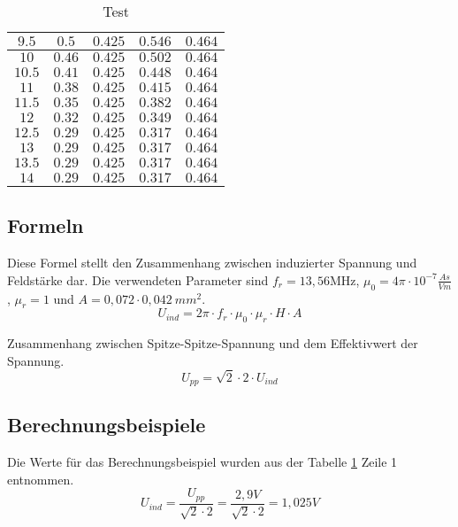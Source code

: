 \documentclass[12pt,a4paper,ngerman]{article}
\begin{document}
\begin{table}[H]
\begin{center}
\begin{tabular}{ |c|c|c|c|c| }
  $9.5$ & $0.5$ & $0.425$ & $0.546$ & $0.464$ \\
      \hline
  $10$ & $0.46$ & $0.425$ & $0.502$ & $0.464$ \\
      \hline
  $10.5$ & $0.41$ & $0.425$ & $0.448$ & $0.464$ \\
      \hline
  $11$ & $0.38$ & $0.425$ & $0.415$ & $0.464$ \\
      \hline
  $11.5$ & $0.35$ & $0.425$ & $0.382$ & $0.464$ \\
      \hline
  $12$ & $0.32$ & $0.425$ & $0.349$ & $0.464$ \\
      \hline
  $12.5$ & $0.29$ & $0.425$ & $0.317$ & $0.464$ \\
      \hline
  $13$ & $0.29$ & $0.425$ & $0.317$ & $0.464$ \\
      \hline
  $13.5$ & $0.29$ & $0.425$ & $0.317$ & $0.464$ \\
        \hline
  $14$ & $0.29$ & $0.425$ & $0.317$ & $0.464$ \\  \hline
\end{tabular}
\caption{Test}
\end{center}
\label{tab:1}
\end{table}
\pagebreak
\subsection{Formeln}
Diese Formel stellt den Zusammenhang zwischen induzierter Spannung und Feldstärke dar. Die verwendeten Parameter sind $f_r = 13,56$MHz, $\mu_0 = 4\pi \cdot 10^{-7}\frac{As}{Vm}$, $\mu_r = 1$ und $A = 0,072 \cdot 0,042\ mm^2$.
\begin{equation}
U_{ind} = 2\pi \cdot f_r \cdot \mu_0 \cdot \mu_r \cdot H \cdot A
\end{equation}

Zusammenhang zwischen Spitze-Spitze-Spannung und dem Effektivwert der Spannung.
\begin{equation}
U_{pp} = \sqrt{2}  \cdot 2 \cdot U_{ind}
\end{equation}

\subsection{Berechnungsbeispiele}
Die Werte für das Berechnungsbeispiel wurden aus der Tabelle \ref{tab:1} Zeile 1 entnommen.
\begin{equation}
U_{ind} = \frac{U_{pp}}{\sqrt{2}  \cdot 2} = \frac{2,9V}{\sqrt{2}  \cdot 2} = 1,025V
\end{equation}
\end{document}
